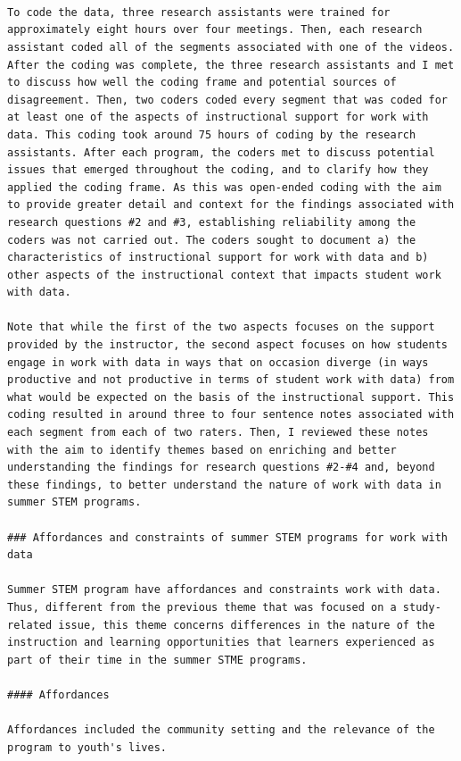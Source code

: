 \documentclass[]{msu-thesis}
\theoremstyle{definition}
\theoremstyle{definition}
\theoremstyle{definition}
\theoremstyle{remark}
\begin{document}
\begin{verbatim}



To code the data, three research assistants were trained for approximately eight hours over four meetings. Then, each research assistant coded all of the segments associated with one of the videos. After the coding was complete, the three research assistants and I met to discuss how well the coding frame and potential sources of disagreement. Then, two coders coded every segment that was coded for at least one of the aspects of instructional support for work with data. This coding took around 75 hours of coding by the research assistants. After each program, the coders met to discuss potential issues that emerged throughout the coding, and to clarify how they applied the coding frame. As this was open-ended coding with the aim to provide greater detail and context for the findings associated with research questions #2 and #3, establishing reliability among the coders was not carried out. The coders sought to document a) the characteristics of instructional support for work with data and b) other aspects of the instructional context that impacts student work with data.

Note that while the first of the two aspects focuses on the support provided by the instructor, the second aspect focuses on how students engage in work with data in ways that on occasion diverge (in ways productive and not productive in terms of student work with data) from what would be expected on the basis of the instructional support. This coding resulted in around three to four sentence notes associated with each segment from each of two raters. Then, I reviewed these notes with the aim to identify themes based on enriching and better understanding the findings for research questions #2-#4 and, beyond these findings, to better understand the nature of work with data in summer STEM programs.

### Affordances and constraints of summer STEM programs for work with data

Summer STEM program have affordances and constraints work with data. Thus, different from the previous theme that was focused on a study-related issue, this theme concerns differences in the nature of the instruction and learning opportunities that learners experienced as part of their time in the summer STME programs.

#### Affordances

Affordances included the community setting and the relevance of the program to youth's lives.


\end{verbatim}
\end{document}
